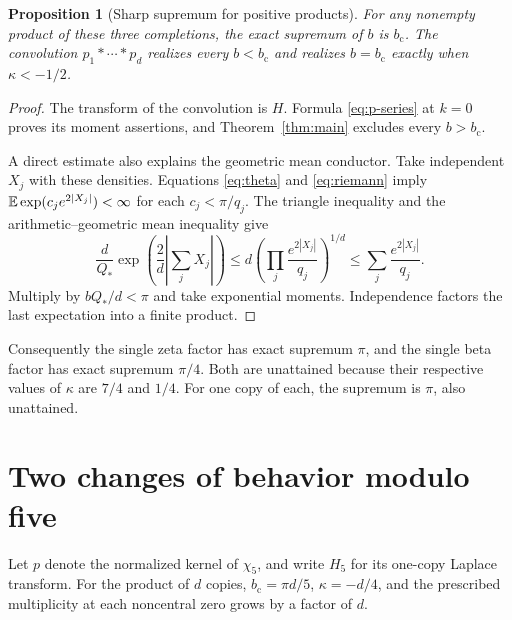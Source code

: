\documentclass[11pt,letterpaper]{article}
\newtheorem{proposition}[theorem]{Proposition}
\newcommand{\bcrit}{b_{\mathrm c}}
\begin{document}
\begin{proposition}[Sharp supremum for positive products]\label{prop:product}
For any nonempty product of these three completions, the exact supremum of $b$ is $\bcrit$. The convolution $p_1*\cdots*p_d$ realizes every $b<\bcrit$ and realizes $b=\bcrit$ exactly when $\kappa<-1/2$.
\end{proposition}
\begin{proof}
The transform of the convolution is $H$. Formula \eqref{eq:p-series} at $k=0$ proves its moment assertions, and Theorem~\ref{thm:main} excludes every $b>\bcrit$.

A direct estimate also explains the geometric mean conductor. Take independent $X_j$ with these densities. Equations \eqref{eq:theta} and \eqref{eq:riemann} imply $\mathbb E\exp(c_j e^{2|X_j|})<\infty$ for each $c_j<\pi/q_j$. The triangle inequality and the arithmetic--geometric mean inequality give
\[
 \frac{d}{Q_*}\exp\!\left(\frac2d\left|\sum_j X_j\right|\right)
 \le d\left(\prod_j\frac{e^{2|X_j|}}{q_j}\right)^{1/d}
 \le \sum_j\frac{e^{2|X_j|}}{q_j}.
\]
Multiply by $bQ_*/d<\pi$ and take exponential moments. Independence factors the last expectation into a finite product.
\end{proof}
Consequently the single zeta factor has exact supremum $\pi$, and the single beta factor has exact supremum $\pi/4$. Both are unattained because their respective values of $\kappa$ are $7/4$ and $1/4$. For one copy of each, the supremum is $\pi$, also unattained.

\section{Two changes of behavior modulo five}
Let $p$ denote the normalized kernel of $\chi_5$, and write $H_5$ for its one-copy Laplace transform. For the product of $d$ copies, $\bcrit=\pi d/5$, $\kappa=-d/4$, and the prescribed multiplicity at each noncentral zero grows by a factor of $d$.
\end{document}
